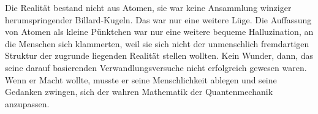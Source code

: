 Die Realität bestand nicht aus Atomen, sie war keine Ansammlung winziger herumspringender Billard-Kugeln. Das war nur eine weitere Lüge. Die Auffassung von Atomen als kleine Pünktchen war nur eine weitere bequeme Halluzination, an die Menschen sich klammerten, weil sie sich nicht der unmenschlich fremdartigen Struktur der zugrunde liegenden Realität stellen wollten. Kein Wunder, dann, das seine darauf basierenden Verwandlungsversuche nicht erfolgreich gewesen waren. Wenn er Macht wollte, musste er seine Menschlichkeit ablegen und seine Gedanken zwingen, sich der wahren Mathematik der Quantenmechanik anzupassen.

